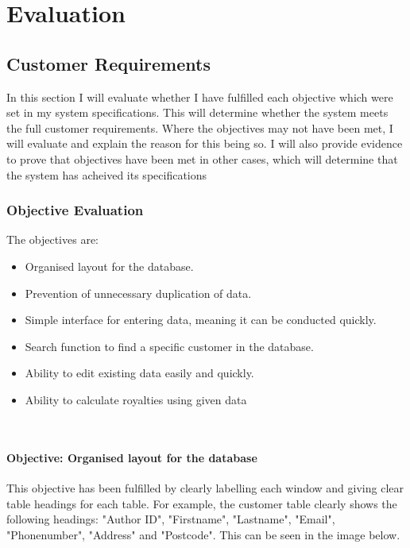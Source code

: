 \chapter{Evaluation}

\section{Customer Requirements}

In this section I will evaluate whether I have fulfilled each objective which were set in my system specifications. This will determine whether the system meets the full customer requirements. Where the objectives may not have been met, I will evaluate and explain the reason for this being so. I will also provide evidence to prove that objectives have been met in other cases, which will determine that the system has acheived its specifications

\subsection{Objective Evaluation}

The objectives are:
\begin{itemize}
    \item Organised layout for the database.
    \item Prevention of unnecessary duplication of data.
    \item Simple interface for entering data, meaning it can be conducted quickly.
    \item Search function to find a specific customer in the database.
    \item Ability to edit existing data easily and quickly.
    \item Ability to calculate royalties using given data
\end{itemize}

\

\subsubsection{Objective: Organised layout for the database}

This objective has been fulfilled by clearly labelling each window and giving clear table headings for each table. For example, the customer table clearly shows the following headings: "Author ID", "Firstname", "Lastname", "Email", "Phonenumber", "Address" and "Postcode". This can be seen in the image below.

